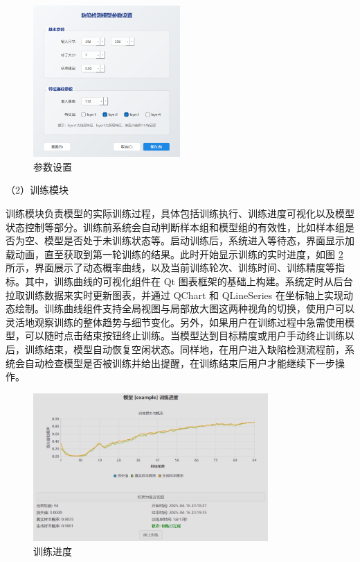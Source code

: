 \documentclass[
  ]{njuthesis}
\begin{document}
\begin{figure}[htb]
    \centering
    \includegraphics[width=0.5\textwidth]{images/参数设置.png}
    \caption{参数设置}
    \label{参数设置}
\end{figure}

（2）训练模块

训练模块负责模型的实际训练过程，具体包括训练执行、训练进度可视化以及模型状态控制等部分。训练前系统会自动判断样本组和模型组的有效性，比如样本组是否为空、模型是否处于未训练状态等。启动训练后，系统进入等待态，界面显示加载动画，直至获取到第一轮训练的结果。此时开始显示训练的实时进度，如图 \ref{训练进度} 所示，界面展示了动态概率曲线，以及当前训练轮次、训练时间、训练精度等指标。其中，训练曲线的可视化组件在 Qt 图表框架的基础上构建。系统定时从后台拉取训练数据来实时更新图表，并通过 QChart 和 QLineSeries 在坐标轴上实现动态绘制。训练曲线组件支持全局视图与局部放大图这两种视角的切换，使用户可以灵活地观察训练的整体趋势与细节变化。另外，如果用户在训练过程中急需使用模型，可以随时点击结束按钮终止训练。当模型达到目标精度或用户手动终止训练以后，训练结束，模型自动恢复空闲状态。同样地，在用户进入缺陷检测流程前，系统会自动检查模型是否被训练并给出提醒，在训练结束后用户才能继续下一步操作。

\begin{figure}[htb]
    \centering
    \includegraphics[width=0.80\textwidth]{images/训练进度.png}
    \caption{训练进度}
    \label{训练进度}
\end{figure}
\end{document}
